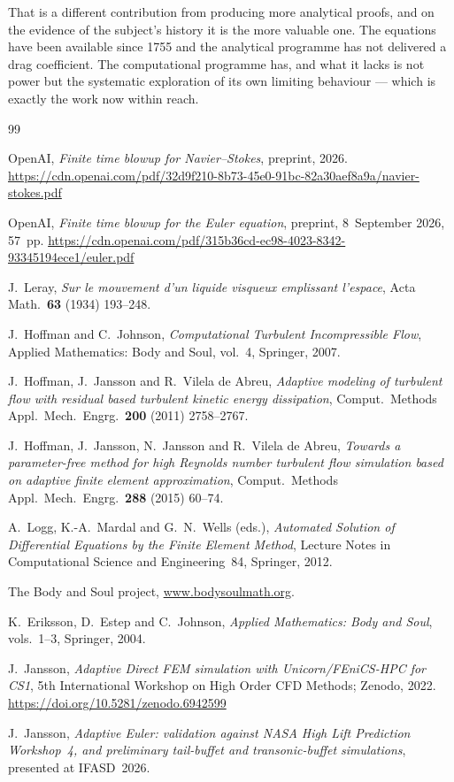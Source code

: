 \documentclass[11pt]{article}
\begin{document}
\noindent That is a different contribution from producing more analytical proofs, and on the evidence
of the subject's history it is the more valuable one. The equations have been available since 1755
and the analytical programme has not delivered a drag coefficient. The computational programme has,
and what it lacks is not power but the systematic exploration of its own limiting behaviour --- which
is exactly the work now within reach.

\begin{thebibliography}{99}

 OpenAI, \emph{Finite time blowup for Navier--Stokes}, preprint, 2026.
\newblock \url{https://cdn.openai.com/pdf/32d9f210-8b73-45e0-91bc-82a30aef8a9a/navier-stokes.pdf}

 OpenAI, \emph{Finite time blowup for the Euler equation}, preprint,
8~September 2026, 57~pp.
\newblock \url{https://cdn.openai.com/pdf/315b36cd-ec98-4023-8342-93345194ece1/euler.pdf}

 J.~Leray, \emph{Sur le mouvement d'un liquide visqueux emplissant l'espace},
Acta Math.\ \textbf{63} (1934) 193--248.

 J.~Hoffman and C.~Johnson, \emph{Computational Turbulent Incompressible Flow},
Applied Mathematics: Body and Soul, vol.~4, Springer, 2007.

 J.~Hoffman, J.~Jansson and R.~Vilela de Abreu, \emph{Adaptive modeling of turbulent
flow with residual based turbulent kinetic energy dissipation}, Comput.\ Methods Appl.\ Mech.\
Engrg.\ \textbf{200} (2011) 2758--2767.

 J.~Hoffman, J.~Jansson, N.~Jansson and R.~Vilela de Abreu, \emph{Towards a
parameter-free method for high Reynolds number turbulent flow simulation based on adaptive finite
element approximation}, Comput.\ Methods Appl.\ Mech.\ Engrg.\ \textbf{288} (2015) 60--74.

 A.~Logg, K.-A.~Mardal and G.~N.~Wells (eds.), \emph{Automated Solution of
Differential Equations by the Finite Element Method}, Lecture Notes in Computational Science and
Engineering~84, Springer, 2012.

 The Body and Soul project, \url{www.bodysoulmath.org}.

 K.~Eriksson, D.~Estep and C.~Johnson, \emph{Applied Mathematics: Body and Soul},
vols.~1--3, Springer, 2004.

 J.~Jansson, \emph{Adaptive Direct FEM simulation with Unicorn/FEniCS-HPC for CS1},
5th International Workshop on High Order CFD Methods; Zenodo, 2022.
\newblock \url{https://doi.org/10.5281/zenodo.6942599}

 J.~Jansson, \emph{Adaptive Euler: validation against NASA High Lift Prediction
Workshop~4, and preliminary tail-buffet and transonic-buffet simulations}, presented at IFASD~2026.

\end{thebibliography}
\end{document}
